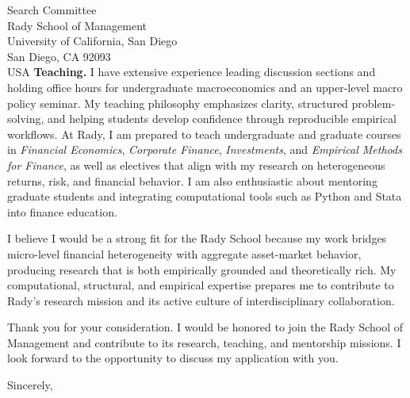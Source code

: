 \documentclass[11pt,letterpaper]{letter}
\begin{document}
\begin{letter}{Search Committee \\
Rady School of Management \\
University of California, San Diego \\
San Diego, CA 92093 \\ USA}
\textbf{Teaching.} I have extensive experience leading discussion sections and holding office hours for undergraduate macroeconomics and an upper-level macro policy seminar. My teaching philosophy emphasizes clarity, structured problem-solving, and helping students develop confidence through reproducible empirical workflows. At Rady, I am prepared to teach undergraduate and graduate courses in \textit{Financial Economics}, \textit{Corporate Finance}, \textit{Investments}, and \textit{Empirical Methods for Finance}, as well as electives that align with my research on heterogeneous returns, risk, and financial behavior. I am also enthusiastic about mentoring graduate students and integrating computational tools such as Python and Stata into finance education.

I believe I would be a strong fit for the Rady School because my work bridges micro-level financial heterogeneity with aggregate asset-market behavior, producing research that is both empirically grounded and theoretically rich. My computational, structural, and empirical expertise prepares me to contribute to Rady’s research mission and its active culture of interdisciplinary collaboration.

Thank you for your consideration. I would be honored to join the Rady School of Management and contribute to its research, teaching, and mentorship missions. I look forward to the opportunity to discuss my application with you.

\closing{Sincerely,}

\end{letter}
\end{document}
